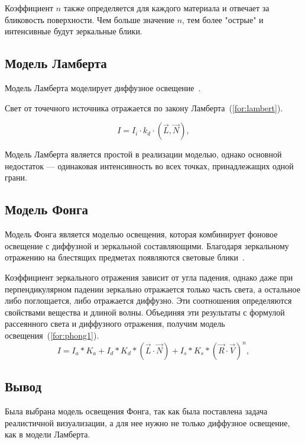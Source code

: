 Коэффициент $n$ также определяется для каждого материала и отвечает за бликовость поверхности. Чем больше значение $n$, тем более "острые" и интенсивные будут зеркальные блики.

\subsection{Модель Ламберта}

Модель Ламберта моделирует диффузное освещение~\cite{roders}.

Свет от точечного источника отражается по закону Ламберта~(\ref{for:lambert}). 

\begin{equation}
	\label{for:lambert}
	I = I_i \cdot k_d \cdot (\vec{L}, \vec{N}),
\end{equation}

Модель Ламберта является простой в реализации моделью, однако основной недостаток --- одинаковая интенсивность во всех точках, принадлежащих одной грани.


\subsection{Модель Фонга}

Модель Фонга является моделью освещения, которая комбинирует фоновое освещение с диффузной и зеркальной составляющими. Благодаря зеркальному отражению на блестящих предметах появляются световые блики~\cite{roders}.

Коэффициент зеркального отражения зависит от угла падения, однако даже при перпендикулярном падении зеркально отражается только часть света, а остальное либо поглощается, либо отражается диффузно. Эти соотношения определяются свойствами вещества и длиной волны. Объединяя эти результаты с формулой рассеянного света и диффузного отражения, получим модель освещения~(\ref{for:phong1}).
\begin{equation} 
	\label{for:phong1}
	I = I_a * K_a + I_d * K_d * (\vec{L} \cdot \vec{N}) + I_s * K_s * (\vec{R} \cdot \vec{V})^n,
\end{equation}

\subsection*{Вывод}

Была выбрана модель освещения Фонга, так как была поставлена задача реалистичной визуализации, а для нее нужно не только диффузное освещение, как в модели Ламберта.

